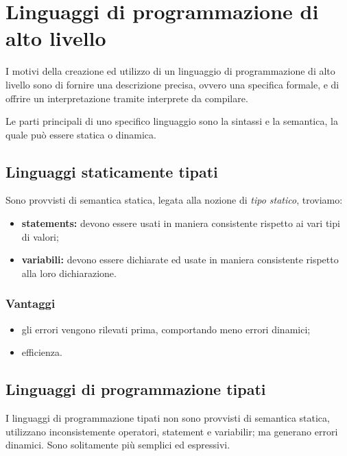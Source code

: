 \chapter{Linguaggi di programmazione di alto livello}\label{ch:lpoo}
I motivi della creazione ed utilizzo di un linguaggio di programmazione di alto
livello sono di fornire una descrizione precisa, ovvero una specifica formale,
e di offrire un interpretazione tramite interprete da compilare.

Le parti principali di uno specifico linguaggio sono la sintassi e la semantica,
la quale può essere statica o dinamica.

\section{Linguaggi staticamente tipati}
Sono provvisti di semantica statica, legata alla nozione di \emph{tipo statico},
troviamo:
\begin{itemize}
  \item \textbf{statements:} devono essere usati in maniera consistente rispetto
    ai vari tipi di valori;
  \item \textbf{variabili:} devono essere dichiarate ed usate in maniera consistente
    rispetto alla loro dichiarazione.
\end{itemize}
\subsection{Vantaggi}
\begin{itemize}
  \item gli errori vengono rilevati prima, comportando meno errori dinamici;
  \item efficienza.
\end{itemize}

\section{Linguaggi di programmazione tipati}
I linguaggi di programmazione tipati non sono provvisti di semantica statica, utilizzano inconsistemente operatori,
statement e variabilir; ma generano errori dinamici.
Sono solitamente più semplici ed espressivi.

